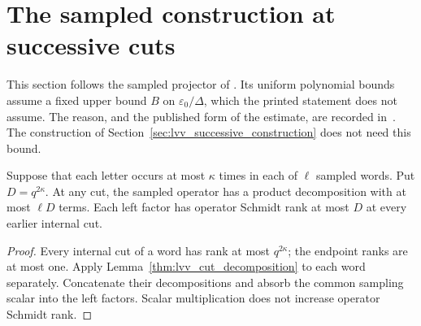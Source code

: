 \section{The sampled construction at successive cuts}
\label{sec:lvv_sampled_construction}

This section follows the sampled projector of \cite{Landau2015Polynomial}.
Its uniform polynomial bounds assume a fixed upper bound $B$ on
$\varepsilon_0/\Delta$, which the printed statement does not assume. The
reason, and the published form of the estimate, are recorded
in~\cite{gap:lvv13_runtime_ground_energy}. The construction of
Section~\ref{sec:lvv_successive_construction} does not need this bound.

\begin{lemma}
    \label{thm:lvv_sampled_cut_decomposition}
    \leanok
    Suppose that each letter occurs at most $\kappa$ times in each of $\ell$
    sampled words. Put $D=q^{2\kappa}$. At any cut, the sampled operator has
    a product decomposition with at most $\ell D$ terms. Each left factor
    has operator Schmidt rank at most $D$ at every earlier internal cut.
\end{lemma}
\begin{proof}
    \leanok
    Every internal cut of a word has rank at most $q^{2\kappa}$; the
    endpoint ranks are at most one. Apply Lemma~\ref{thm:lvv_cut_decomposition}
    to each word separately. Concatenate their decompositions and absorb
    the common sampling scalar into the left factors. Scalar multiplication
    does not increase operator Schmidt rank.
\end{proof}

